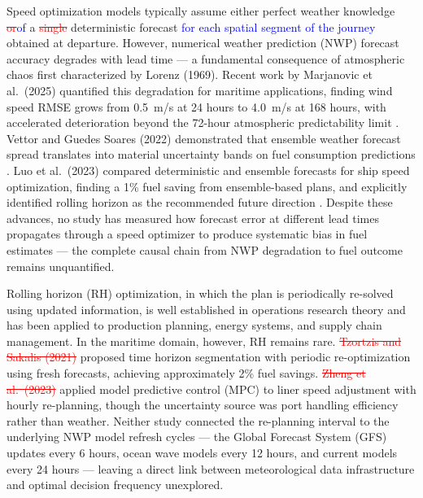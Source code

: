 \documentclass[review,authoryear]{elsarticle}  %
\newcommand{\revadd}[1]{\textcolor{blue}{#1}}
\newcommand{\revdel}[1]{\textcolor{red}{\sout{#1}}}
\newcommand{\revrep}[2]{\revdel{#2}\revadd{#1}}
\begin{document}
Speed optimization models typically assume either perfect weather knowledge \revrep{of}{or} a \revdel{single }deterministic forecast \revadd{for each spatial segment of the journey} obtained at departure. However, numerical weather prediction (NWP) forecast accuracy degrades with lead time --- a fundamental consequence of atmospheric chaos first characterized by Lorenz (1969). Recent work by Marjanovic et al.\ (2025) quantified this degradation for maritime applications, finding wind speed RMSE grows from 0.5~m/s at 24 hours to 4.0~m/s at 168 hours, with accelerated deterioration beyond the 72-hour atmospheric predictability limit \citet{Marjanovic2025}.  Vettor and Guedes Soares (2022) demonstrated that ensemble weather forecast spread translates into material uncertainty bands on fuel consumption predictions \citet{Vettor2022}. Luo et al.\ (2023) compared deterministic and ensemble forecasts for ship speed optimization, finding a 1\% fuel saving from ensemble-based plans, and explicitly identified rolling horizon as the recommended future direction \citet{Luo2023}. Despite these advances, no study has measured how forecast error at different lead times propagates through a speed optimizer to produce systematic bias in fuel estimates --- the complete causal chain from NWP degradation to fuel outcome remains unquantified.

Rolling horizon (RH) optimization, in which the plan is periodically re-solved using updated information, is well established in operations research theory \citet{Sethi1991}  and has been applied to production planning, energy systems, and supply chain management. In the maritime domain, however, RH remains rare. \revdel{Tzortzis and Sakalis (2021) }\citet{Tzortzis2021} proposed time horizon segmentation with periodic re-optimization using fresh forecasts, achieving approximately 2\% fuel savings. \citet{Zheng2023} \revdel{Zheng et al.\ (2023)} applied model predictive control (MPC) to liner speed adjustment with hourly re-planning, though the uncertainty source was port handling efficiency rather than weather. Neither study connected the re-planning interval to the underlying NWP model refresh cycles --- the Global Forecast System (GFS) updates every 6 hours, ocean wave models every 12 hours, and current models every 24 hours --- leaving a direct link between meteorological data infrastructure and optimal decision frequency unexplored.
\end{document}
